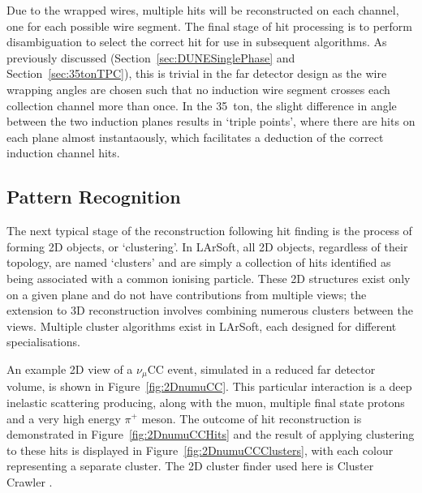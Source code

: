 Due to the wrapped wires, multiple hits will be reconstructed on each channel, one for each possible wire segment.  The final stage of hit processing is to perform disambiguation to select the correct hit for use in subsequent algorithms.  As previously discussed (Section~\ref{sec:DUNESinglePhase} and Section~\ref{sec:35tonTPC}), this is trivial in the far detector design as the wire wrapping angles are chosen such that no induction wire segment crosses each collection channel more than once.  In the 35~ton, the slight difference in angle between the two induction planes results in `triple points', where there are hits on each plane almost instantaously, which facilitates a deduction of the correct induction channel hits.

\subsection{Pattern Recognition}\label{sec:PatternRecognition}

The next typical stage of the reconstruction following hit finding is the process of forming 2D objects, or `clustering'.  In LArSoft, all 2D objects, regardless of their topology, are named `clusters' and are simply a collection of hits identified as being associated with a common ionising particle.  These 2D structures exist only on a given plane and do not have contributions from multiple views; the extension to 3D reconstruction involves combining numerous clusters between the views.  Multiple cluster algorithms exist in LArSoft, each designed for different specialisations.

An example 2D view of a $\nu_{\mu}$CC event, simulated in a reduced far detector volume, is shown in Figure~\ref{fig:2DnumuCC}.  This particular interaction is a deep inelastic scattering producing, along with the muon, multiple final state protons and a very high energy $\pi^+$ meson.  The outcome of hit reconstruction is demonstrated in Figure~\ref{fig:2DnumuCCHits} and the result of applying clustering to these hits is displayed in Figure~\ref{fig:2DnumuCCClusters}, with each colour representing a separate cluster.  The 2D cluster finder used here is Cluster Crawler \cite{ClusterCrawler}.


